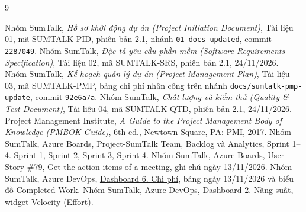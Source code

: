 \documentclass[12pt,a4paper]{report}
\begin{document}
\begin{thebibliography}{9}
   Nhóm SumTalk, \emph{Hồ sơ khởi động dự án (Project Initiation Document)}, Tài liệu 01,
    mã SUMTALK-PID, phiên bản 2.1, nhánh \texttt{01-docs-updated}, commit \texttt{2287049}.
   Nhóm SumTalk, \emph{Đặc tả yêu cầu phần mềm (Software Requirements Specification)},
    Tài liệu 02, mã SUMTALK-SRS, phiên bản 2.1, 24/11/2026.
   Nhóm SumTalk, \emph{Kế hoạch quản lý dự án (Project Management Plan)}, Tài liệu 03,
    mã SUMTALK-PMP, bảng chi phí nhân công trên nhánh \texttt{docs/sumtalk-pmp-update}, commit \texttt{92e6a7a}.
   Nhóm SumTalk, \emph{Chất lượng và kiểm thử (Quality \& Test Document)}, Tài liệu 04,
    mã SUMTALK-QTD, phiên bản 2.1, 24/11/2026.
   Project Management Institute, \emph{A Guide to the Project Management Body of Knowledge
    (PMBOK Guide)}, 6th ed., Newtown Square, PA: PMI, 2017.
   Nhóm SumTalk, Azure Boards, Project-SumTalk Team, Backlog và Analytics, Sprint 1--4.
    \href{https://dev.azure.com/CC3011-261-1/Project-SumTalk/_sprints/analytics/Project-SumTalk\%20Team/Project-SumTalk/Sprint\%201}{Sprint 1},
    \href{https://dev.azure.com/CC3011-261-1/Project-SumTalk/_sprints/analytics/Project-SumTalk\%20Team/Project-SumTalk/Sprint\%202}{Sprint 2},
    \href{https://dev.azure.com/CC3011-261-1/Project-SumTalk/_sprints/analytics/Project-SumTalk\%20Team/Project-SumTalk/Sprint\%203}{Sprint 3},
    \href{https://dev.azure.com/CC3011-261-1/Project-SumTalk/_sprints/analytics/Project-SumTalk\%20Team/Project-SumTalk/Sprint\%204}{Sprint 4}.
   Nhóm SumTalk, Azure Boards,
    \href{https://dev.azure.com/CC3011-261-1/Project-SumTalk/_workitems/edit/79}{User Story \#79, Get the action items of a meeting},
    ghi chú ngày 13/11/2026.
   Nhóm SumTalk, Azure DevOps,
    \href{https://dev.azure.com/CC3011-261-1/ee3d7079-7e4a-4f7a-814c-654e0d993dfe/45b6cb83-8144-4528-9deb-f7dc9d37ff46/_dashboards/dashboard/54dcbfda-bc9c-4bf8-b39a-9169b387bebf}{Dashboard 6. Chi phí},
    bảng ngày 13/11/2026 và biểu đồ Completed Work.
   Nhóm SumTalk, Azure DevOps,
    \href{https://dev.azure.com/CC3011-261-1/ee3d7079-7e4a-4f7a-814c-654e0d993dfe/45b6cb83-8144-4528-9deb-f7dc9d37ff46/_dashboards/dashboard/acc45bdc-ffa8-43f3-a7df-46b7b828273e}{Dashboard 2. Năng suất},
    widget Velocity (Effort).
\end{thebibliography}
\end{document}
